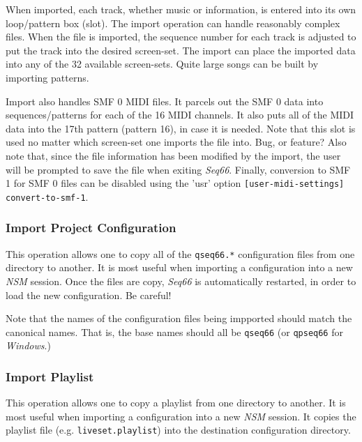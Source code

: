    When imported, each track, whether music or information,
   is entered into its own loop/pattern box (slot).
   The import operation can handle reasonably complex files.
   When the file is imported, the sequence number for each track is
   adjusted to put the track into the desired screen-set.
   The import can place the imported data into any of the 32 available
   screen-sets.  Quite large songs can be built by importing patterns.

   Import also handles SMF 0 MIDI files.  It parcels out the SMF 0 data
   into sequences/patterns for each of the 16 MIDI channels.  It also puts
   all of the MIDI data into the 17th pattern (pattern 16), in case it is
   needed.  Note that this slot is used no matter which screen-set one imports
   the file into.  Bug, or feature?
   Also note that, since the file information has been modified by the import,
   the user will be prompted to save the file when exiting \textsl{Seq66}.
   Finally, conversion to SMF 1 for SMF 0 files can be disabled using the
   'usr' option \texttt{[user-midi-settings] convert-to-smf-1}.

\subsubsection{Import Project Configuration}
\label{subsubsec:midi_export_file_import_project}

   This operation allows one to copy all of the \texttt{qseq66.*} configuration
   files from one directory to another.  It is most useful when
   importing a configuration into a new \textsl{NSM} session.
   Once the files are copy, \textsl{Seq66} is automatically restarted,
   in order to load the new configuration.  Be careful!

   Note that the names of the configuration files being impported should
   match the canonical names.  That is, the base names should all be
   \texttt{qseq66} (or \texttt{qpseq66} for \textsl{Windows}.)

\subsubsection{Import Playlist}
\label{subsubsec:midi_export_file_import_playlist}

   This operation allows one to copy a playlist
   from one directory to another.  It is most useful when
   importing a configuration into a new \textsl{NSM} session.
   It copies the playlist file (e.g. \texttt{liveset.playlist})
   into the destination configuration directory.

